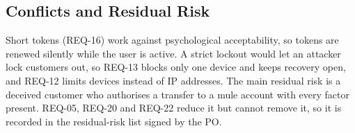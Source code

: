 \subsection{Conflicts and Residual Risk}

Short tokens (\mbox{REQ-16}) work against psychological acceptability, so tokens
are renewed silently while the user is active. A strict lockout would let
an attacker lock customers out, so \mbox{REQ-13} blocks only one device and
keeps recovery open, and \mbox{REQ-12} limits devices instead of IP addresses.
The main residual risk is a deceived customer who authorises a transfer
to a mule account with every factor present. \mbox{REQ-05}, \mbox{REQ-20} and \mbox{REQ-22} reduce it
but cannot remove it, so it is recorded in the residual-risk list signed
by the PO.
